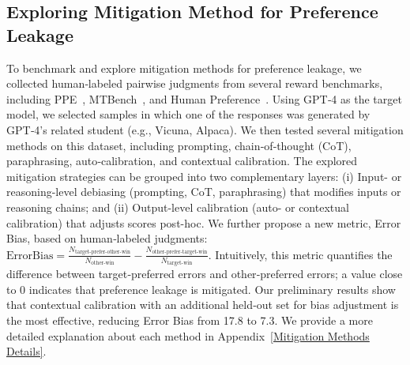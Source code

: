 \documentclass{article} %
\begin{document}
\subsection{Exploring Mitigation Method for Preference Leakage}
\label{Exploring Mitigation Method for Preference Leakage}
\begin{table}
\vspace{-22pt}
\caption{Error Bias with various mitigation methods (lower is better).}
\vspace{5pt}
\centering
\small
{}
\vspace{-10pt}
\label{tab:error_bias}
\end{table}
To benchmark and explore mitigation methods for preference leakage, we collected human‑labeled pairwise judgments from several reward benchmarks, including PPE~\cite{perez2022ppe}, MTBench~\cite{zheng2023mtbench}, and Human Preference~\cite{chiang2024chatbot}. Using GPT‑4 as the target model, we selected samples in which one of the responses was generated by GPT‑4’s related student (e.g., Vicuna, Alpaca). We then tested several mitigation methods on this dataset, including prompting, chain‑of‑thought (CoT), paraphrasing, auto‑calibration, and contextual calibration. The explored mitigation strategies can be grouped into two complementary layers: (i) Input- or reasoning-level debiasing (prompting, CoT, paraphrasing) that modifies inputs or reasoning chains; and (ii) Output-level calibration (auto- or contextual calibration) that adjusts scores post-hoc. We further propose a new metric, Error Bias, based on human‑labeled judgments: $\mathrm{ErrorBias} =\frac{N_{\text{target-prefer-other-win}}}{N_{\text{other-win}}}-\frac{N_{\text{other-prefer-target-win}}}{N_{\text{target-win}}}$. Intuitively, this metric quantifies the difference between target‑preferred errors and other‑preferred errors; a value close to 0 indicates that preference leakage is mitigated. Our preliminary results show that contextual calibration with an additional held‑out set for bias adjustment is the most effective, reducing Error Bias from 17.8 to 7.3. We provide a more detailed explanation about each method in Appendix~\ref{Mitigation Methods Details}.
\end{document}
